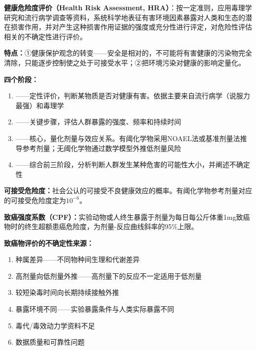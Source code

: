 \begin{keybox}
\textbf{健康危险度评价（Health Risk Assessment, HRA）}：按一定准则，应用毒理学研究和流行病学调查等资料，系统科学地表征有害环境因素暴露对人类和生态的潜在损害作用，并对产生这种损害作用证据的强度或充分性进行评定，对危险性评估相关的不确定性进行评价。

\textbf{特点：}①健康保护观念的转变——安全是相对的，不可能将有害健康的污染物完全清除，只能逐步控制使之处于可接受水平；②把环境污染对健康的影响定量化。

\textbf{四个阶段：}
\begin{enumerate}[leftmargin=*]
    \item {}——定性评价，判断某物质是否对健康有害。依据主要来自流行病学（说服力最强）和毒理学
    \item {}——关键步骤，评估人群暴露的强度、频率和持续时间
    \item {}——核心，量化剂量与效应关系。有阈化学物采用NOAEL法或基准剂量法推导参考剂量；无阈化学物通过数学模型外推低剂量风险
    \item {}——综合前三阶段，分析判断人群发生某种危害的可能性大小，并阐述不确定性
\end{enumerate}

\textbf{可接受危险度：}社会公认的可接受不良健康效应的概率。有阈化学物参考剂量对应的可接受危险度定为$10^{-6}$。

\textbf{致癌强度系数（CPF）：}实验动物或人终生暴露于剂量为每日每公斤体重1mg致癌物时的终生超额患癌危险度，为剂量-反应曲线斜率的95\%上限。
\end{keybox}

\begin{tipbox}
\textbf{致癌物评价的不确定性来源：}
\begin{enumerate}[leftmargin=*]
    \item 种属差异——不同物种间生理和代谢差异
    \item 高剂量向低剂量外推——高剂量下的反应不一定适用于低剂量
    \item 较短染毒时间向长期持续接触外推
    \item 暴露环境不同——实验暴露条件与人类实际暴露不同
    \item 毒代/毒效动力学资料不足
    \item 数据质量和可靠性问题
\end{enumerate}
\end{tipbox}

